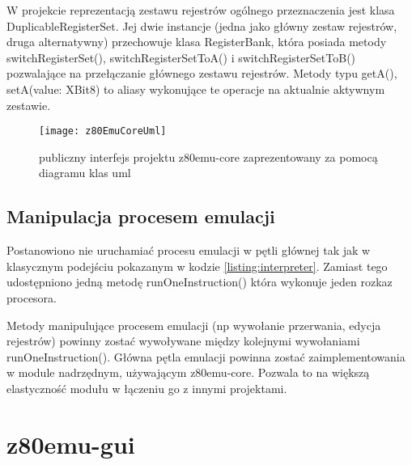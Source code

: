 	W projekcie reprezentacją zestawu rejestrów ogólnego przeznaczenia jest klasa DuplicableRegisterSet. Jej dwie instancje (jedna jako główny zestaw rejestrów, druga alternatywny) przechowuje klasa RegisterBank, która posiada metody switchRegisterSet(), switchRegisterSetToA() i switchRegisterSetToB() pozwalające na przełączanie głównego zestawu rejestrów. Metody typu getA(), setA(value: XBit8) to aliasy wykonujące te operacje na aktualnie aktywnym zestawie. 
	
		
	
	\begin{figure}[h]
		\centering
		\texttt{[image: z80EmuCoreUml]}
		\caption{publiczny interfejs projektu z80emu-core zaprezentowany za pomocą diagramu klas uml}
		\label{img:z80emuCoreUml}
	\end{figure}
	
	\subsection{Manipulacja procesem emulacji}
		
	Postanowiono nie uruchamiać procesu emulacji w pętli głównej tak jak w klasycznym podejściu pokazanym w kodzie \ref{listing:interpreter}. Zamiast tego udostępniono jedną metodę runOneInstruction() która wykonuje jeden rozkaz procesora.
	
	Metody manipulujące procesem emulacji (np wywołanie przerwania, edycja rejestrów) powinny zostać wywoływane między kolejnymi wywołaniami runOneInstruction(). Główna pętla emulacji powinna zostać zaimplementowania w module nadrzędnym, używającym z80emu-core. Pozwala to na większą elastyczność modułu w łączeniu go z innymi projektami.
	
	
	
	
	
	\section{z80emu-gui}
	
	